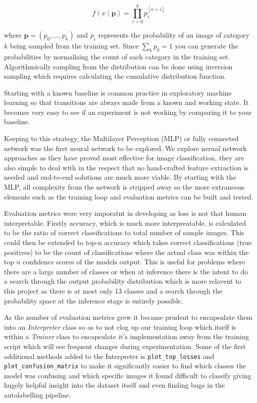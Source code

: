 $$ f(x \;|\; \bm{p}) = \prod\limits_{i=0}^{k}{p_i^{[x=i]}} $$

where $\bm{p} = (p_0, ..., p_k)$ and $p_i$ represents the probability of an image of category $k$ being sampled from the training set.
Since $\sum_{k}{p_k} = 1$ you can generate the probabilities by normalising the count of each category in the training set.  Algorithmically 
sampling from the distribution can be done using inversion sampling which requires calculating the cumulative distribution function.

Starting with a known baseline is common practice in exploratory machine learning \cite{mukhoti2018importance} so that transitions are always made from a known and working state.  
It becomes very easy to see if an experiment is not working by comparing it to your baseline.

Keeping to this strategy, the Multilayer Perception (MLP) or fully connected network \cite{murtagh1991multilayer} was the first neural network to be explored.
We explore nerual network approaches as they have proved most effective for image classification, they are also simple to deal
with in the respect that no hand-crafted feature extraction is needed and end-to-end solutions are much more viable.
By starting with the MLP, all complexity from the network is stripped away so the more extraneous elements such as the training loop and 
evaluation metrics can be built and tested.

Evaluation metrics were very imporatnt in developing as loss is not that human interpretable.  Firstly accuracy, which is much more interpreatable, 
is calculated to be the ratio of correct classifications to total number of sample images.  This could then be extended to top-n accuracy which 
takes correct classifications (true positives) to be the count of classifications where the actual class was within the top $n$ confidence scores 
of the models output.  This is useful for problems where there are a large number of classes or when at inference there is the intent to do a search
through the output probability distribution which is more relavent to this project as there is at most only 13 classes and a search through the probability 
space at the inference stage is entirely possible.


As the number of evaluation metrics grew it became prudent to encapsulate them into an \textit{Interpreter} class so as to not clog up our 
training loop which itself is within a \textit{Trainer} class to encapsulate it's implementation away from the training script which will 
see frequent changes during experimentation.  Some of the first additional methods added to the Interpreter is \verb|plot_top_losses| and
\verb|plot_confusion_matrix| to make it significantly easier to find which classes the model was confusing and which specific images it 
found difficult to classify giving hugely helpful insight into the dataset itself and even finding bugs in the autolabelling pipeline.

